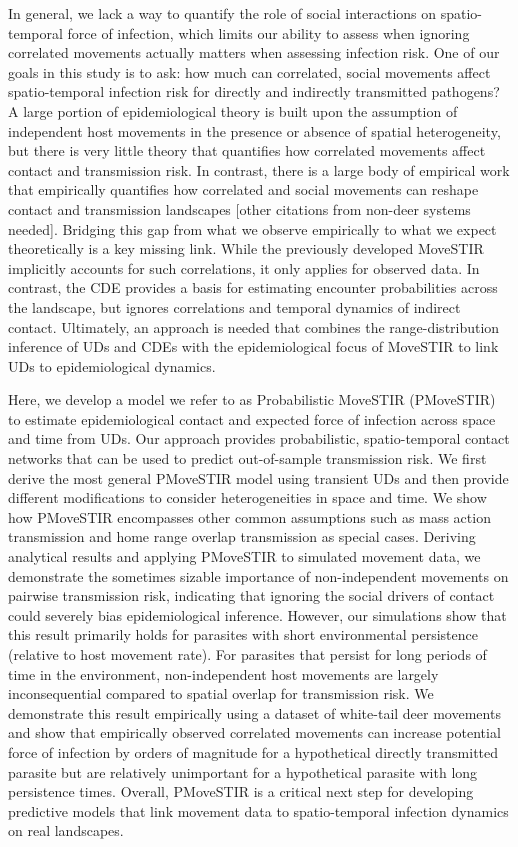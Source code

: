 \documentclass[letterpaper]{article}
\begin{document}
In general, we lack a way to quantify the role of social interactions on spatio-temporal force of infection, which limits our ability to assess when ignoring correlated movements actually matters when assessing infection risk. One of our goals in this study is to ask: how much can correlated, social movements affect spatio-temporal infection risk for directly and indirectly transmitted pathogens? A large portion of epidemiological theory is built upon the assumption of independent host movements in the presence or absence of spatial heterogeneity, but there is very little theory that quantifies how correlated movements affect contact and transmission risk.  In contrast, there is a large body of empirical work that empirically quantifies how correlated and social movements can reshape contact and transmission landscapes \citep{Kjaer2008,Grear2010,Schauber2015a,Webber2023} [other citations from non-deer systems needed].  Bridging this gap from what we observe empirically to what we expect theoretically is a key missing link. While the previously developed MoveSTIR implicitly accounts for such correlations, it only applies for observed data. In contrast, the CDE provides a basis for estimating encounter probabilities across the landscape, but ignores correlations and temporal dynamics of indirect contact.
Ultimately, an approach is needed that combines the range-distribution inference of UDs and CDEs \citep{Alston2022,Noonan2021} with the epidemiological focus of MoveSTIR to link UDs to epidemiological dynamics. 

Here, we develop a model we refer to as Probabilistic MoveSTIR (PMoveSTIR) to estimate epidemiological contact and expected force of infection across space and time from UDs. Our approach provides probabilistic, spatio-temporal contact networks that can be used to predict out-of-sample transmission risk. We first derive the most general PMoveSTIR model using transient UDs and then provide different modifications to consider heterogeneities in space and time. We show how PMoveSTIR encompasses other common assumptions such as mass action transmission and home range overlap transmission as special cases. Deriving analytical results and applying PMoveSTIR to simulated movement data, we demonstrate the sometimes sizable importance of non-independent movements on pairwise transmission risk, indicating that ignoring the social drivers of contact could severely bias epidemiological inference. However, our simulations show that this result primarily holds for parasites with short environmental persistence (relative to host movement rate). For parasites that persist for long periods of time in the environment, non-independent host movements are largely inconsequential compared to spatial overlap for transmission risk. We demonstrate this result empirically using a dataset of white-tail deer movements and show that empirically observed correlated movements can increase potential force of infection by orders of magnitude for a hypothetical directly transmitted parasite but are relatively unimportant for a hypothetical parasite with long persistence times. Overall, PMoveSTIR is a critical next step for developing predictive models that link movement data to spatio-temporal infection dynamics on real landscapes.
\end{document}

